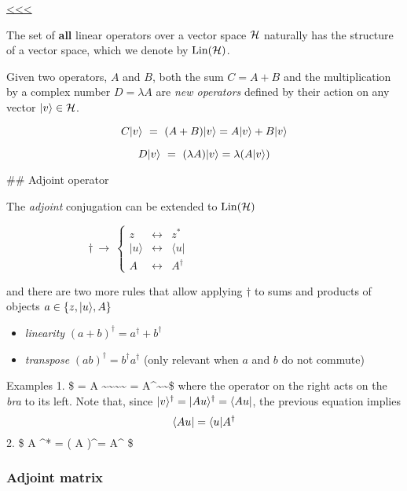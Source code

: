 \documentclass[11pt]{article}
\begin{document}
\hyperref[top]{<<<}

    The set of \textbf{all} linear operators over a vector space \({\cal H}\)
naturally has the structure of a vector space, which we denote by
\(\hbox{Lin}({\cal H})\).

    Given two operators, \(A\) and \(B\), both the sum \(C = A + B\) and the
multiplication by a complex number \(D = \lambda A\) are \emph{new
operators} defined by their action on any vector \(|v\rangle \in {\cal H}\).

\[
C|v\rangle ~=~ (A + B) |v\rangle = A|v\rangle + B|v\rangle
\]

\[
D|v\rangle ~=~ (\lambda A) |v\rangle = \lambda (A|v\rangle)
\]

    \#\# Adjoint operator

The \emph{adjoint} conjugation can be extended to \({\rm Lin}({\cal H})\)

\[
\dagger ~\to ~
\left\{
\begin{matrix}
z & \leftrightarrow  &  z^* \\
|u\rangle & \leftrightarrow &   \langle u | \\
A & \leftrightarrow & A^{\dagger}
\end{matrix}
\right. \hspace{5cm}
\]

    and there are two more rules that allow applying \(\dagger\) to sums and
products of objects \(a \in \{z, |u\rangle, A\}\)

\begin{itemize}
\item
  \emph{linearity} \((a + b)^\dagger = a^\dagger + b^\dagger\)
\item
  \emph{transpose} \((ab)^\dagger = b^\dagger a^\dagger\) (only relevant
  when \(a\) and \(b\) do not commute)
\end{itemize}

    Examples 1. \$  = A 
\textasciitilde\textasciitilde{}\st{\Leftrightarrow}\textasciitilde\textasciitilde{}
 =  A\^{}\dagger \textasciitilde\textasciitilde\$ where
the operator on the right acts on the \emph{bra} to its left. Note that,
since \(|v\rangle^\dagger = |Au\rangle^\dagger = \langle Au|\), the previous
equation implies \[
\langle Au| = \langle u| A^\dagger
\] 2. \$  A \^{}* = ( A )\^{}\dagger =
 A\^{}\dagger {} \$

    \subsubsection{Adjoint matrix}\label{adjoint-matrix}
\end{document}
